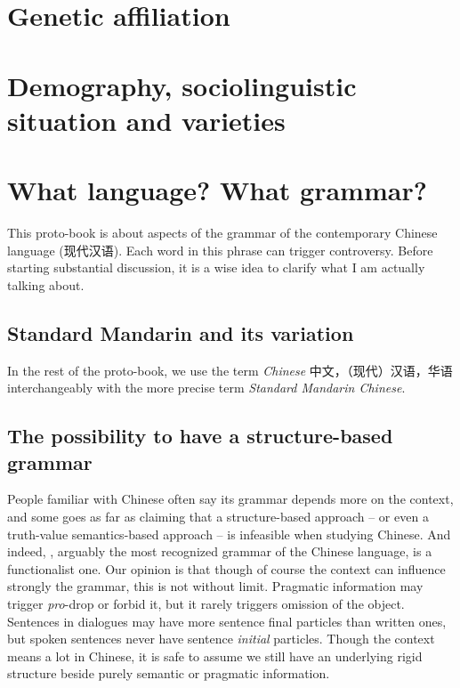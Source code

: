 \documentclass[../main.tex]{subfiles}
\begin{document}
\section{Genetic affiliation}


\section{Demography, sociolinguistic situation and varieties}

\section{What language? What grammar?}

This proto-book is about aspects of the grammar of the contemporary Chinese language (现代汉语). 
Each word in this phrase can trigger controversy. Before starting substantial discussion, it is a wise idea 
to clarify what I am actually talking about. 

\subsection{Standard Mandarin and its variation}


In the rest of the proto-book, we use the term \emph{Chinese} 中文，（现代）汉语，华语 interchangeably with 
the more precise term \emph{Standard Mandarin Chinese}.

\subsection{The possibility to have a structure-based grammar}\label{sec:structure-based}

People familiar with Chinese often say its grammar depends more on the context, and some goes as far as 
claiming that a structure-based approach -- or even a truth-value semantics-based approach -- is infeasible 
when studying Chinese. And indeed, \citet{li1989mandarin}, arguably the most recognized grammar of the Chinese 
language, is a functionalist one. Our opinion is that though of course the context can influence strongly the 
grammar, this is not without limit. Pragmatic information may trigger \emph{pro}-drop or forbid it, but it 
rarely triggers omission of the object. Sentences in dialogues may have more sentence final particles than 
written ones, but spoken sentences never have sentence \emph{initial} particles. Though the context means 
a lot in Chinese, it is safe to assume we still have an underlying rigid structure beside purely semantic 
or pragmatic information.
\end{document}

